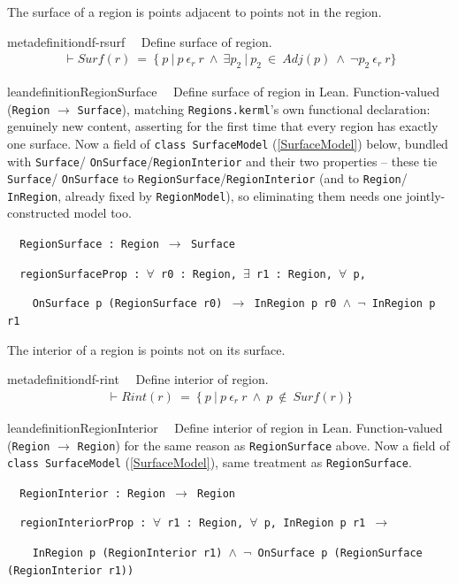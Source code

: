 \pn The surface of a region is points adjacent to points not in the region.

\begin{restatable}{metadefinition}{df-rsurf}~~ Define surface of region.
\begin{align}
\vdash \textit{Surf}(r)~=~ \{~p~\vert~p~\epsilon_r~r~\wedge~\exists p_2~\vert~ p_2~\in~\textit{Adj}(p)~\wedge~\lnot p_2 ~\epsilon_r~r \}
\label{eq:df-rsurf}\tag{df-rsurf}
\end{align}
\end{restatable}

\begin{restatable}{leandefinition}{RegionSurface}~~ Define surface of region in Lean.
Function-valued (\texttt{Region} $\to$ \texttt{Surface}), matching \texttt{Regions.kerml}'s own functional
declaration: genuinely new content, asserting for the first time that every region has exactly one surface.
Now a field of \texttt{class SurfaceModel} (\ref{SurfaceModel}) below, bundled with \texttt{Surface}/
\texttt{OnSurface}/\texttt{RegionInterior} and their two properties -- these tie \texttt{Surface}/
\texttt{OnSurface} to \texttt{RegionSurface}/\texttt{RegionInterior} (and to \texttt{Region}/
\texttt{InRegion}, already fixed by \texttt{RegionModel}), so eliminating them needs one jointly-constructed
model too.

\texttt{~~RegionSurface : Region $\to$ Surface}

\texttt{~~regionSurfaceProp : $\forall$ r0 : Region, $\exists$ r1 : Region, $\forall$ p,}

\texttt{~~~~OnSurface p (RegionSurface r0) $\to$ InRegion p r0 $\wedge$ $\lnot$ InRegion p r1}
\label{RegionSurface}
\end{restatable}

\pn The interior of a region is points not on its surface.

\begin{restatable}{metadefinition}{df-rint}~~ Define interior of region.
\begin{align}
\vdash \textit{Rint}(r)~=~ \{~p~\vert~p~\epsilon_r~r~\wedge~p~\notin~\textit{Surf}(r) \}
\label{eq:df-rint}\tag{df-rint}
\end{align}
\end{restatable}

\begin{restatable}{leandefinition}{RegionInterior}~~ Define interior of region in Lean.
Function-valued (\texttt{Region} $\to$ \texttt{Region}) for the same reason as \texttt{RegionSurface} above.
Now a field of \texttt{class SurfaceModel} (\ref{SurfaceModel}), same treatment as \texttt{RegionSurface}.

\texttt{~~RegionInterior : Region $\to$ Region}

\texttt{~~regionInteriorProp : $\forall$ r1 : Region, $\forall$ p, InRegion p r1 $\to$}

\texttt{~~~~InRegion p (RegionInterior r1) $\wedge$ $\lnot$ OnSurface p (RegionSurface (RegionInterior r1))}
\label{RegionInterior}
\end{restatable}

